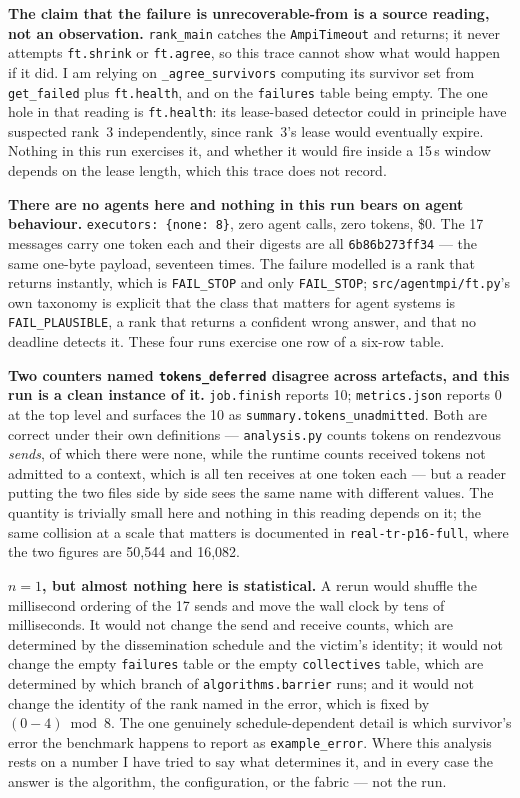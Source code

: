 \documentclass[11pt]{article}
\begin{document}
\textbf{The claim that the failure is unrecoverable-from is a source reading, not an
observation.} \texttt{rank\_main} catches the \texttt{AmpiTimeout} and returns; it never
attempts \texttt{ft.shrink} or \texttt{ft.agree}, so this trace cannot show what would
happen if it did. I am relying on \texttt{\_agree\_survivors} computing its survivor set
from \texttt{get\_failed} plus \texttt{ft.health}, and on the \texttt{failures} table
being empty. The one hole in that reading is \texttt{ft.health}: its lease-based detector
could in principle have suspected rank~3 independently, since rank~3's lease would
eventually expire. Nothing in this run exercises it, and whether it would fire inside a
15\,s window depends on the lease length, which this trace does not record.

\textbf{There are no agents here and nothing in this run bears on agent behaviour.}
\texttt{executors: \{none: 8\}}, zero agent calls, zero tokens, \$0. The 17 messages carry
one token each and their digests are all \texttt{6b86b273ff34} --- the same one-byte
payload, seventeen times. The failure modelled is a rank that returns instantly, which is
\texttt{FAIL\_STOP} and only \texttt{FAIL\_STOP}; \texttt{src/agentmpi/ft.py}'s own
taxonomy is explicit that the class that matters for agent systems is
\texttt{FAIL\_PLAUSIBLE}, a rank that returns a confident wrong answer, and that no
deadline detects it. These four runs exercise one row of a six-row table.

\textbf{Two counters named \texttt{tokens\_deferred} disagree across artefacts, and this
run is a clean instance of it.} \texttt{job.finish} reports 10;
\texttt{metrics.json} reports 0 at the top level and surfaces the 10 as
\texttt{summary.tokens\_unadmitted}. Both are correct under their own definitions ---
\texttt{analysis.py} counts tokens on rendezvous \emph{sends}, of which there were none,
while the runtime counts received tokens not admitted to a context, which is all ten
receives at one token each --- but a reader putting the two files side by side sees the
same name with different values. The quantity is trivially small here and nothing in this
reading depends on it; the same collision at a scale that matters is documented in
\texttt{real-tr-p16-full}, where the two figures are 50{,}544 and 16{,}082.

\textbf{$n=1$, but almost nothing here is statistical.} A rerun would shuffle the
millisecond ordering of the 17 sends and move the wall clock by tens of milliseconds. It
would not change the send and receive counts, which are determined by the dissemination
schedule and the victim's identity; it would not change the empty \texttt{failures} table
or the empty \texttt{collectives} table, which are determined by which branch of
\texttt{algorithms.barrier} runs; and it would not change the identity of the rank named
in the error, which is fixed by $(0-4) \bmod 8$. The one genuinely schedule-dependent
detail is which survivor's error the benchmark happens to report as
\texttt{example\_error}. Where this analysis rests on a number I have tried to say what
determines it, and in every case the answer is the algorithm, the configuration, or the
fabric --- not the run.
\end{document}
